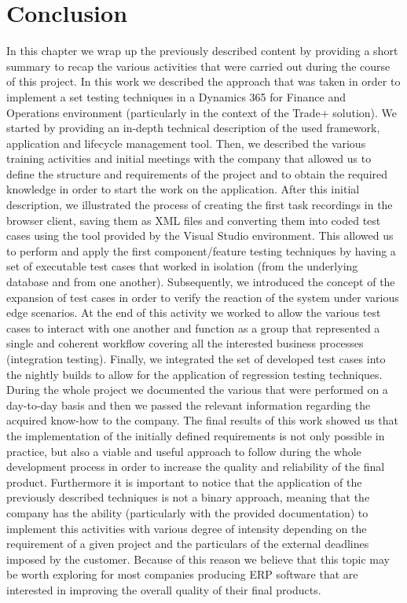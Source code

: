\chapter{Conclusion}

In this chapter we wrap up the previously described content by providing a short summary to recap the various activities that were carried out during the course of this project. In this work we described the approach that was taken in order to implement a set testing techniques in a Dynamics 365 for Finance and Operations environment (particularly in the context of the Trade+ solution). We started by providing an in-depth technical description of the used framework, application and lifecycle management tool. Then, we described the various training activities and initial meetings with the company that allowed us to define the structure and requirements of the project and to obtain the required knowledge in order to start the work on the application. After this initial description, we illustrated the process of creating the first task recordings in the browser client, saving them as XML files and converting them into coded test cases using the tool provided by the Visual Studio environment. This allowed us to perform and apply the first component/feature testing techniques by having a set of executable test cases that worked in isolation (from the underlying database and from one another). Subsequently, we introduced the concept of the expansion of test cases in order to verify the reaction of the system under various edge scenarios. At the end of this activity we worked to allow the various test cases to interact with one another and function as a group that represented a single and coherent workflow covering all the interested business processes (integration testing).  Finally, we integrated the set of developed test cases into the nightly builds to allow for the application of regression testing techniques. During the whole project we documented the various that were performed on a day-to-day basis and then we passed the relevant information regarding the acquired know-how to the company. The final results of this work showed us that the implementation of the initially defined requirements is not only possible in practice, but also a viable and useful approach to follow during the whole development process in order to increase the quality and reliability of the final product. Furthermore it is important to notice that the application of the previously described techniques is not a binary approach, meaning that the company has the ability (particularly with the provided documentation) to implement this activities with various degree of intensity depending on the requirement of a given project and the particulars of the external deadlines imposed by the customer. Because of this reason we believe that this topic may be worth exploring for most companies producing ERP software that are interested in improving the overall quality of their final products.



